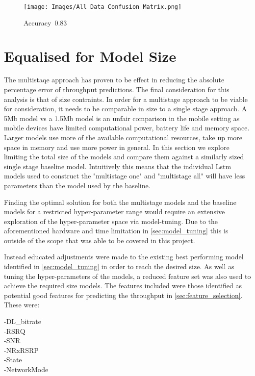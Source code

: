 \begin{figure}[H]
\texttt{[image: Images/All Data Confusion Matrix.png]}
\centering
\caption{Accuracy~0.83}
\label{fig:std_all_data_classifier}
\end{figure}




\newpage
\section{Equalised for Model Size}
\label{sec:size_con_models}
The multistaqe approach has proven to be effect in reducing the absolute percentage error of throughput predictions. The final consideration for this analysis is that of size contraints. In order for a multistage approach to be viable for consideration, it needs to be comparable in size to a single stage approach. A 5Mb model vs a 1.5Mb model is an unfair comparison in the mobile setting as mobile devices have limited computational power, battery life and memory space. Larger models use more of the available computational resources, take up more space in memory and use more power in general. In this section we explore limiting the total size of the models and compare them against a similarly sized single stage baseline model. Intuitively this means that the individual Lstm models used to construct the "multistage one" and "multistage all" will have less parameters than the model used by the baseline.

Finding the optimal solution for both the multistage models and the baseline models for a restricted hyper-parameter range would require an extensive exploration of the hyper-parameter space via model-tuning. Due to the aforementioned hardware and time limitation in \ref{sec:model_tuning} this is outside of the scope that was able to be covered in this project.

Instead educated adjustments were made to the existing best performing model identified in \ref{sec:model_tuning} in order to reach the desired size. As well as tuning the hyper-parameters of the models, a reduced feature set was also used to achieve the required size models. The features included were those identified as potential good features for predicting the throughput in \ref{sec:feature_selection}. These were:

-DL\_bitrate \\
-RSRQ \\
-SNR \\
-NRxRSRP \\
-State \\
-NetworkMode

